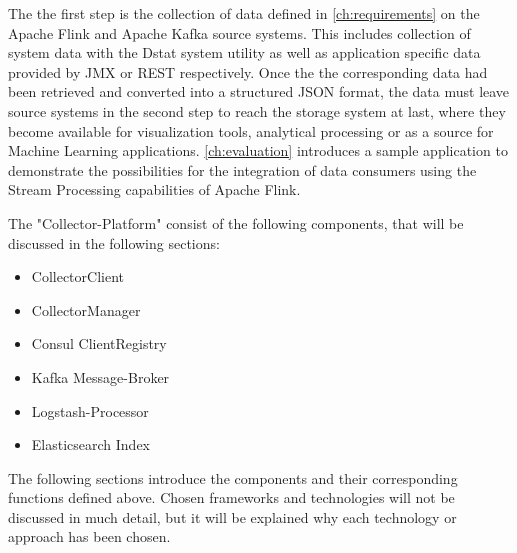 The the first step is the collection of data defined in \autoref{ch:requirements} on the Apache Flink and Apache Kafka source
systems. This includes collection of system data with the Dstat system utility as well as application specific data provided
by JMX or REST respectively. Once the the corresponding data had been retrieved and converted into a structured JSON format,
the data must leave source systems in the second step to reach the storage system at last, where they become available for
visualization tools, analytical processing or as a source for Machine Learning applications. \autoref{ch:evaluation} introduces
a sample application to demonstrate the possibilities for the integration of data consumers using the Stream Processing capabilities
of Apache Flink.

The "Collector-Platform" consist of the following components, that will be discussed in the following sections:

\begin{itemize}
    \item CollectorClient
    \item CollectorManager
    \item Consul ClientRegistry
    \item Kafka Message-Broker
    \item Logstash-Processor
    \item Elasticsearch Index
\end{itemize}

The following sections introduce the components and their corresponding functions defined above. Chosen frameworks and
technologies will not be discussed in much detail, but it will be explained why each technology or approach has been chosen.
%
%
%
%
